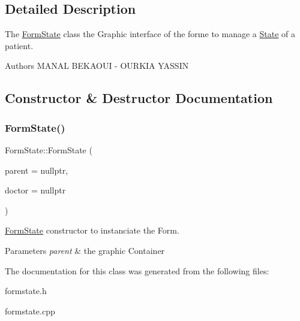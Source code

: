 \subsection{Detailed Description}
The \mbox{\hyperlink{class_form_state}{Form\+State}} class the Graphic interface of the forme to manage a \mbox{\hyperlink{class_state}{State}} of a patient. 

\begin{DoxyAuthor}{Authors}
M\+A\+N\+AL B\+E\+K\+A\+O\+UI -\/ O\+U\+R\+K\+IA Y\+A\+S\+S\+IN 
\end{DoxyAuthor}


\subsection{Constructor \& Destructor Documentation}
\mbox{\label{class_form_state_a11287a7459c21ef2ec89b13f738855b0}} 
\subsubsection{\texorpdfstring{FormState()}{FormState()}}
{\footnotesize\ttfamily Form\+State\+::\+Form\+State (\begin{DoxyParamCaption}\item[{Q\+Widget $\ast$}]{parent = {\ttfamily nullptr},  }\item[{Q\+String}]{doctor = {\ttfamily nullptr} }\end{DoxyParamCaption})\hspace{0.3cm}{\ttfamily [explicit]}}



\mbox{\hyperlink{class_form_state}{Form\+State}} constructor to instanciate the Form. 


\begin{DoxyParams}{Parameters}
{\em parent} & the graphic Container \\
\hline
\end{DoxyParams}


The documentation for this class was generated from the following files\+:\begin{DoxyCompactItemize}
\item 
formstate.\+h\item 
formstate.\+cpp\end{DoxyCompactItemize}
